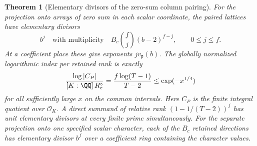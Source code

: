 \documentclass[a4paper,11pt]{article}
\newtheorem{theorem}[proposition]{Theorem}
\theoremstyle{definition}
\theoremstyle{remark}
\numberwithin{equation}{section}
\begin{document}
\begin{theorem}[Elementary divisors of the zero-sum column pairing]\leavevmode
\label{thm:scalarcost326}
For the projection onto arrays of zero sum in each scalar
coordinate, the paired lattices have elementary divisors
\[
         b^j\quad\text{with multiplicity}\quad
             B_c\binom fj(b-2)^{f-j},\qquad 0\le j\le f .
\]
At a coefficient place these give exponents \(jv_{\mathfrak p}(b)\).
The globally normalized logarithmic index per retained rank
is exactly
\[
 \frac{\log|C_P|}{[K:\QQ]\,R_c^\circ}
     =\frac{f\log(T-1)}{T-2}\le \exp(-x^{1/4})
\]
for all sufficiently large \(x\) on the common intervals.
Here \(C_P\) is the finite integral quotient over \(\mathcal O_K\).
A direct summand of relative rank
\((1-1/(T-2))^f\) has unit elementary divisors at every
finite prime simultaneously. For the separate projection
onto one specified scalar character, each of the \(B_c\)
retained directions has elementary divisor \(b^f\) over
a coefficient ring containing the character values.
\end{theorem}
\end{document}
